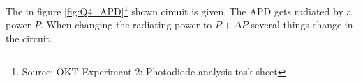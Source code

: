 %
% 
%
%
%
%
%
%
%
%
%
%
%
%

The in figure \ref{fig:Q4_APD}\footnote[1]{Source: OKT Experiment 2: Photodiode analysis task-sheet} shown circuit is given.
The APD gets radiated by a power $P$. 
When changing the radiating power to $P + \Delta P$ several things change in the circuit.

